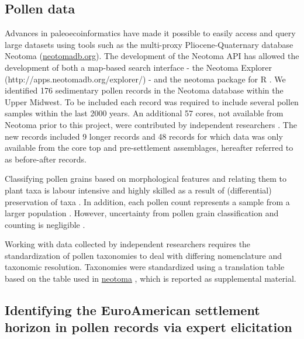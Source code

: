 \documentclass[12pt]{article}
\begin{document}

\subsection{Pollen data}

Advances in paleoecoinformatics have made it possible to easily access
and query large datasets using tools such as the multi-proxy
Pliocene-Quaternary database Neotoma (\url{neotomadb.org}). The
development of the Neotoma API has allowed the development of both a
map-based search interface - the Neotoma Explorer
(http://apps.neotomadb.org/explorer/) - and the neotoma package for R
\citep{goring2015}. We identified 176 sedimentary pollen records in
the Neotoma database within the Upper Midwest. To be included each
record was required to include several pollen samples within the last
2000 years.  An additional 57 cores, not available from Neotoma prior
to this project, were contributed by independent researchers
\citep{kujawa2015}. The new records included 9 longer records and 48
records for which data was only available from the core top and
pre-settlement assemblages, hereafter referred to as before-after
records.

Classifying pollen grains based on morphological features and relating
them to plant taxa is labour intensive and highly skilled as a result
of (differential) preservation of taxa \citep{havinga1964,
  havinga1984}. In addition, each pollen count represents a sample
from a larger population \citep{maher2012assessment,
  maher1981statistics}. However, uncertainty from pollen grain
classification and counting is negligible \citep{webb1978sensing,
  webb1978mapped}. 

Working with data collected by independent researchers requires the
standardization of pollen taxonomies to deal with differing
nomenclature and taxonomic resolution. Taxonomies were standardized
using a translation table based on the table used in \url{neotoma}
\citep{goring}, which is reported as supplemental material.

\subsection{Identifying the EuroAmerican settlement horizon in pollen records via expert elicitation}
\end{document}

